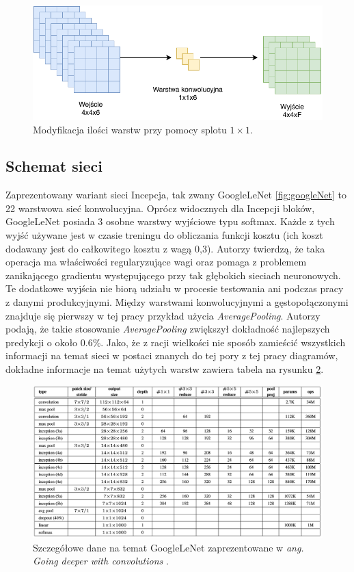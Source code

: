 \begin{figure}[ht]
\centerline{\includegraphics[scale=1]{resources/dlawik.pdf}}
\caption{Modyfikacja ilości warstw przy pomocy splotu \(1 \times 1\).}
\label{fig:dlawik}
\end{figure}

\subsection{Schemat sieci}

Zaprezentowany wariant sieci Incepcja, tak zwany GoogleLeNet \ref{fig:googleNet} to 22 warstwowa sieć konwolucyjna. Oprócz widocznych dla Incepcji bloków, GoogleLeNet posiada 3 osobne warstwy
wyjściowe typu softmax. Każde z tych wyjść używane jest w czasie treningu do obliczania funkcji kosztu (ich koszt dodawany jest do całkowitego kosztu z wagą 0,3).
Autorzy twierdzą, że taka operacja ma właściwości regularyzujące wagi oraz pomaga z problemem zanikającego gradientu występującego przy tak głębokich sieciach neuronowych.
Te dodatkowe wyjścia nie biorą udziału w procesie testowania ani podczas pracy z danymi produkcyjnymi.
Między warstwami konwolucyjnymi a gęstopołączonymi znajduje się pierwszy w tej pracy przykład użycia \textit{AveragePooling}. Autorzy podają, że takie stosowanie \textit{AveragePooling} zwiększył dokładność najlepszych predykcji o około 0.6\%.
Jako, że z racji wielkości nie sposób zamieścić wszystkich informacji na temat sieci w postaci znanych do tej pory z tej pracy diagramów, dokładne informacje na temat użytych warstw zawiera tabela na rysunku \ref{fig:googleNettable}.

\begin{figure}[ht]
\centerline{\includegraphics[scale=0.3]{resources/inception/googleNet-table.png}}
\caption{Szczegółowe dane na temat GoogleLeNet zaprezentowane w \textit{ang. Going deeper with convolutions} \cite{inceptionpaper}.} 
\label{fig:googleNettable}
\end{figure}

